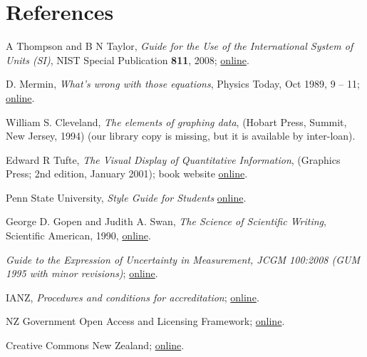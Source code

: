 \section{References}

\begingroup
\renewcommand{\section}[2]{}%

\begin{thebibliography}{9}
A Thompson and B N Taylor, \textit{Guide for the Use of the International System of Units (SI)}, NIST Special Publication \textbf{811}, 2008; \href{http://www.nist.gov/pml/pubs/sp811/index.cfm}{online}.

D. Mermin, \textit{What’s wrong with those equations}, Physics Today, Oct 1989, 9 – 11; \href{http://home.sandiego.edu/~severn/p480w/mathprose.pdf}{online}. 

William S. Cleveland, \textit{The elements of graphing data}, (Hobart Press, Summit, New Jersey, 1994) (our library copy is missing, but it is available by inter-loan).

Edward R Tufte, \textit{The Visual Display of Quantitative Information}, (Graphics Press; 2nd edition, January 2001); book website \href{http://www.edwardtufte.com/tufte/books_vdqi}{online}.

Penn State University, \textit{Style Guide for Students} \href{https://www.e-education.psu.edu/styleforstudents/}{online}.

George D. Gopen and Judith A. Swan, \textit{The Science of Scientific Writing}, Scientific American, 1990, \href{https://www.e-education.psu.edu/styleforstudents/c10_p6.html}{online}.

 \textit{Guide to the Expression of Uncertainty in Measurement, JCGM 100:2008 (GUM 1995 with minor revisions)}; \href{http://www.bipm.org/utils/common/documents/jcgm/JCGM_100_2008_E.pdf}{online}.

 IANZ, \textit{Procedures and conditions for accreditation}; \href{http://www.ianz.govt.nz/resources/documents-2/supplementary-criteria/}{online}.

 NZ Government Open Access and Licensing Framework; \href{https://www.ict.govt.nz/guidance-and-resources/open-government/new-zealand-government-open-access-and-licensing-nzgoal-framework}{online}.

 Creative Commons New Zealand; \href{https://www.tohatoha.org.nz/creative-commons/}{online}. 

\end{thebibliography}
\endgroup